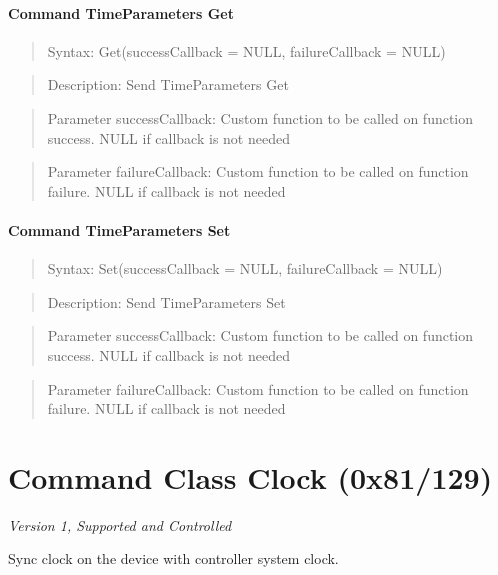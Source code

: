 \paragraph{Command TimeParameters Get}
\begin{quote}Syntax: Get(successCallback = NULL, failureCallback = NULL)\end{quote}
\begin{quote}Description: Send TimeParameters Get\end{quote}
\begin{quote}Parameter successCallback: Custom function to be called on function success. NULL if callback is not needed\end{quote}
\begin{quote}Parameter failureCallback: Custom function to be called on function failure. NULL if callback is not needed\end{quote}


\paragraph{Command TimeParameters Set}
\begin{quote}Syntax: Set(successCallback = NULL, failureCallback = NULL)\end{quote}
\begin{quote}Description: Send TimeParameters Set\end{quote}
\begin{quote}Parameter successCallback: Custom function to be called on function success. NULL if callback is not needed\end{quote}
\begin{quote}Parameter failureCallback: Custom function to be called on function failure. NULL if callback is not needed\end{quote}



\section{Command Class Clock (0x81/129)}

\textit{Version 1, Supported and Controlled}
\newline

Sync clock on the device with controller system clock.
